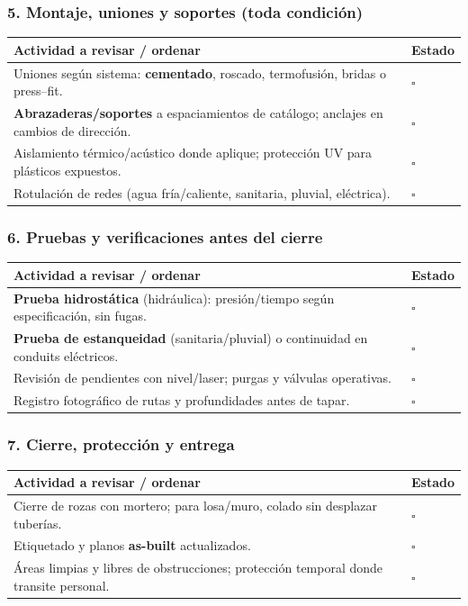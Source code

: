 \documentclass[12pt]{article}
\newcommand{\cbox}{\(\square\)}
\renewcommand{\cbox}{\(\square\)} %
\begin{document}
	\subsubsection*{5. Montaje, uniones y soportes (toda condición)}
	\begin{tabularx}{\linewidth}{>{\raggedright\arraybackslash}p{0.93\linewidth} >{\centering\arraybackslash}m{0.07\linewidth}}
		\toprule
		\textbf{Actividad a revisar / ordenar} & \textbf{Estado}\\
		\midrule
		Uniones según sistema: \textbf{cementado}, roscado, termofusión, bridas o press–fit. & \cbox \\
		\textbf{Abrazaderas/soportes} a espaciamientos de catálogo; anclajes en cambios de dirección. & \cbox \\
		Aislamiento térmico/acústico donde aplique; protección UV para plásticos expuestos. & \cbox \\
		Rotulación de redes (agua fría/caliente, sanitaria, pluvial, eléctrica). & \cbox \\
		\bottomrule
	\end{tabularx}
	
	\subsubsection*{6. Pruebas y verificaciones antes del cierre}
	\begin{tabularx}{\linewidth}{>{\raggedright\arraybackslash}p{0.93\linewidth} >{\centering\arraybackslash}m{0.07\linewidth}}
		\toprule
		\textbf{Actividad a revisar / ordenar} & \textbf{Estado}\\
		\midrule
		\textbf{Prueba hidrostática} (hidráulica): presión/tiempo según especificación, sin fugas. & \cbox \\
		\textbf{Prueba de estanqueidad} (sanitaria/pluvial) o continui\-dad en conduits eléctricos. & \cbox \\
		Revisión de pendientes con nivel/laser; purgas y válvulas operativas. & \cbox \\
		Registro fotográfico de rutas y profundidades antes de tapar. & \cbox \\
		\bottomrule
	\end{tabularx}
	
	\subsubsection*{7. Cierre, protección y entrega}
	\begin{tabularx}{\linewidth}{>{\raggedright\arraybackslash}p{0.93\linewidth} >{\centering\arraybackslash}m{0.07\linewidth}}
		\toprule
		\textbf{Actividad a revisar / ordenar} & \textbf{Estado}\\
		\midrule
		Cierre de rozas con mortero; para losa/muro, colado sin desplazar tuberías. & \cbox \\
		Etiquetado y planos \textbf{as-built} actualizados. & \cbox \\
		Áreas limpias y libres de obstrucciones; protección temporal donde transite personal. & \cbox \\
		\bottomrule
	\end{tabularx}
	
\end{document}
